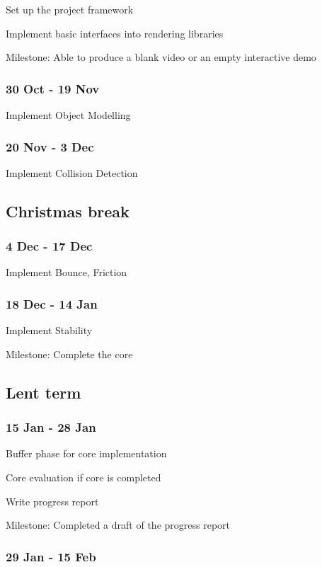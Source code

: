 \documentclass[12pt]{article}
\begin{document}
Set up the project framework

Implement basic interfaces into rendering libraries

Milestone: Able to produce a blank video or an empty interactive demo

\subsubsection*{30 Oct - 19 Nov}

Implement Object Modelling

\subsubsection*{20 Nov - 3 Dec}

Implement Collision Detection

\subsection*{Christmas break}

\subsubsection*{4 Dec - 17 Dec}

Implement Bounce, Friction

\subsubsection*{18 Dec - 14 Jan}

Implement Stability

Milestone: Complete the core

\subsection*{Lent term}

\subsubsection*{15 Jan - 28 Jan}

Buffer phase for core implementation

Core evaluation if core is completed

Write progress report

Milestone: Completed a draft of the progress report

\subsubsection*{29 Jan - 15 Feb}
\end{document}
